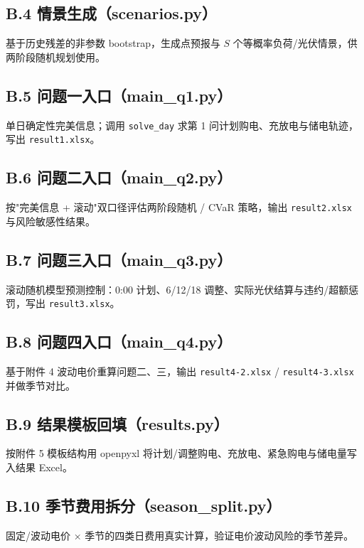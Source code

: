 \documentclass[withoutpreface]{cumcmthesis}
\begin{document}
\begin{appendices}
\subsection{B.4 情景生成（scenarios.py）}\label{app:scen}
基于历史残差的非参数 bootstrap，生成点预报与 $S$ 个等概率负荷/光伏情景，供两阶段随机规划使用。


\subsection{B.5 问题一入口（main\_q1.py）}\label{app:q1}
单日确定性完美信息；调用 \texttt{solve\_day} 求第 1 问计划购电、充放电与储电轨迹，写出 \texttt{result1.xlsx}。


\subsection{B.6 问题二入口（main\_q2.py）}\label{app:q2}
按"完美信息 + 滚动"双口径评估两阶段随机 / CVaR 策略，输出 \texttt{result2.xlsx} 与风险敏感性结果。


\subsection{B.7 问题三入口（main\_q3.py）}\label{app:q3}
滚动随机模型预测控制：0:00 计划、6/12/18 调整、实际光伏结算与违约/超额惩罚，写出 \texttt{result3.xlsx}。


\subsection{B.8 问题四入口（main\_q4.py）}\label{app:q4}
基于附件 4 波动电价重算问题二、三，输出 \texttt{result4-2.xlsx} / \texttt{result4-3.xlsx} 并做季节对比。


\subsection{B.9 结果模板回填（results.py）}\label{app:results}
按附件 5 模板结构用 openpyxl 将计划/调整购电、充放电、紧急购电与储电量写入结果 Excel。


\subsection{B.10 季节费用拆分（season\_split.py）}\label{app:season}
固定/波动电价 × 季节的四类日费用真实计算，验证电价波动风险的季节差异。



\end{appendices}
\end{document}
